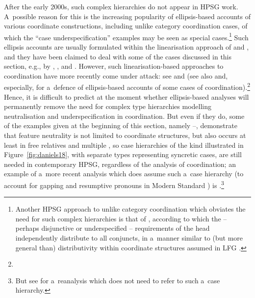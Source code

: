 \documentclass[output=paper
 	        ,biblatex
                ,babelshorthands
                ,newtxmath
                ,draftmode
                ,colorlinks, citecolor=brown
]{langscibook}
\begin{document}
\begin{exe}
\begin{xlist}
\begin{exe}
\begin{xlist}
After the early 2000s, such complex  hierarchies do not appear in HPSG work.  A~possible
reason for this is the increasing popularity of ellipsis-based accounts of various coordinate
constructions, including unlike category coordination cases, of which the “case underspecification”
examples %
 may be seen as special cases.\footnote{Another HPSG
  approach to unlike category coordination which obviates the need for such complex hierarchies is
  that of \citet{yata:04}, according to which the – perhaps disjunctive or underspecified –
  requirements of the head independently distribute to all conjuncts, in a~manner similar to (but
  more general than) distributivity within coordinate structures assumed in LFG
  \citep{DK2000a,dal:kin:sad:09,prz:pat:12a}.}  Such ellipsis accounts are usually formulated within
the linearisation approach of \citet{Reape92a,Reape94a} and \citet{Kathol95a}, and they have
been claimed to deal with some of the cases discussed in this section, e.g., by
\citet{Crysmann2003c}, \citet{BS2004a}, and \citet{chav:06,chav:08}.  However, such
linearisation-based approaches to coordination have more recently come under attack: see
\citet{levi:11} and \citet{kub:lev:15} (see also \citealt{yata:12,Yatabe2016a-u} and, especially,
\citealt{yat:wai:18} for a~defence of ellipsis-based accounts of some cases of coordination).\footnote{%
}
Hence, it is difficult to predict at the moment whether ellipsis-based analyses will permanently
remove the need for complex type hierarchies modelling neutralisation and underspecification in
coordination.  But even if they do, some of the examples given at the beginning of this section,
namely –, demonstrate that feature neutrality is not limited to
coordinate structures, but also occurs at least in free relatives and multiple , so case
hierarchies of the kind illustrated in Figure~\ref{fig:daniels18}, with separate types representing syncretic cases, are still needed in contemporary HPSG, regardless of the analysis of coordination; an example of a~more recent analysis which does assume such a~case hierarchy (to account for gapping and resumptive pronouns in Modern Standard ) is \citet{AB2013a-u}.\footnote{But see \citet{crys:17} for a~reanalysis which does not need to refer to such a~case hierarchy.}




\end{xlist}
\end{exe}
\end{xlist}
\end{exe}
\end{document}

